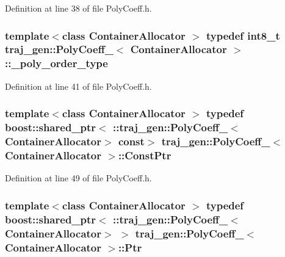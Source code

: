Definition at line 38 of file Poly\+Coeff.\+h.

\subsubsection[{\texorpdfstring{\+\_\+poly\+\_\+order\+\_\+type}{_poly_order_type}}]{\setlength{\rightskip}{0pt plus 5cm}template$<$class Container\+Allocator $>$ typedef int8\+\_\+t {\bf traj\+\_\+gen\+::\+Poly\+Coeff\+\_\+}$<$ Container\+Allocator $>$\+::{\bf \+\_\+poly\+\_\+order\+\_\+type}}\hypertarget{structtraj__gen_1_1_poly_coeff___a33d9b89513ff0ce3f0c9085468edbfe6}{}\label{structtraj__gen_1_1_poly_coeff___a33d9b89513ff0ce3f0c9085468edbfe6}


Definition at line 41 of file Poly\+Coeff.\+h.

\subsubsection[{\texorpdfstring{Const\+Ptr}{ConstPtr}}]{\setlength{\rightskip}{0pt plus 5cm}template$<$class Container\+Allocator $>$ typedef boost\+::shared\+\_\+ptr$<$ \+::{\bf traj\+\_\+gen\+::\+Poly\+Coeff\+\_\+}$<$Container\+Allocator$>$ const$>$ {\bf traj\+\_\+gen\+::\+Poly\+Coeff\+\_\+}$<$ Container\+Allocator $>$\+::{\bf Const\+Ptr}}\hypertarget{structtraj__gen_1_1_poly_coeff___a0729b0dcc7df622ea72b75cc06207041}{}\label{structtraj__gen_1_1_poly_coeff___a0729b0dcc7df622ea72b75cc06207041}


Definition at line 49 of file Poly\+Coeff.\+h.

\subsubsection[{\texorpdfstring{Ptr}{Ptr}}]{\setlength{\rightskip}{0pt plus 5cm}template$<$class Container\+Allocator $>$ typedef boost\+::shared\+\_\+ptr$<$ \+::{\bf traj\+\_\+gen\+::\+Poly\+Coeff\+\_\+}$<$Container\+Allocator$>$ $>$ {\bf traj\+\_\+gen\+::\+Poly\+Coeff\+\_\+}$<$ Container\+Allocator $>$\+::{\bf Ptr}}\hypertarget{structtraj__gen_1_1_poly_coeff___a79cb414eeeaedd1f8c1c0472f9912699}{}\label{structtraj__gen_1_1_poly_coeff___a79cb414eeeaedd1f8c1c0472f9912699}


